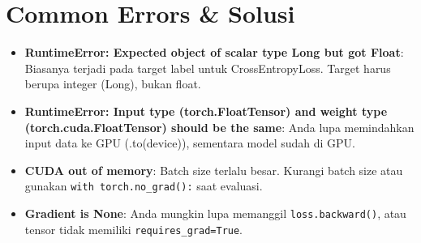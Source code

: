 \section{Common Errors & Solusi}

\begin{itemize}
    \item \textbf{RuntimeError: Expected object of scalar type Long but got Float}:
    Biasanya terjadi pada target label untuk CrossEntropyLoss. Target harus berupa integer (Long), bukan float.
    \item \textbf{RuntimeError: Input type (torch.FloatTensor) and weight type (torch.cuda.FloatTensor) should be the same}:
    Anda lupa memindahkan input data ke GPU (.to(device)), sementara model sudah di GPU.
    \item \textbf{CUDA out of memory}:
    Batch size terlalu besar. Kurangi batch size atau gunakan \texttt{with torch.no\_grad():} saat evaluasi.
    \item \textbf{Gradient is None}:
    Anda mungkin lupa memanggil \texttt{loss.backward()}, atau tensor tidak memiliki \texttt{requires\_grad=True}.
\end{itemize}
